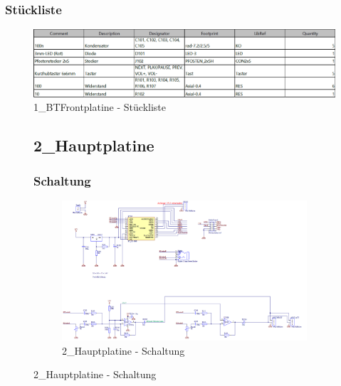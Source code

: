 \subsubsection*{Stückliste}
\begin{figure} [H]
	\centering
	\includegraphics[width=1\textwidth]{img/BTModul/front_Blist.png}
	\caption{1\_BTFrontplatine - Stückliste}
	\label {fig:8.10.6}
\end{figure}





\begin{figure}
	\subsection{2\_Hauptplatine}
	\subsubsection*{Schaltung}
	\begin{figure} [H]
		\centering
		\includegraphics[width=1\textwidth]{img/BTModul/hauptboard_sch.png}
		\caption{2\_Hauptplatine - Schaltung}
		\label {fig:8.10.7}
	\end{figure}
\end{figure}

